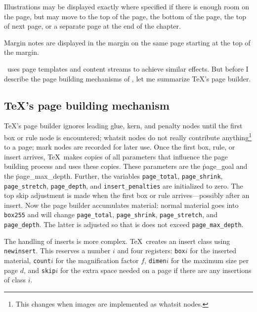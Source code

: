 \item Illustrations may be displayed exactly where specified if there is enough
room on the page, but may move to the top of the page, the bottom of the page,
the top of next page, or a separate page at the end of the chapter.

\item Margin notes are displayed in the margin on the same page starting at the top
of the margin.
\enditemize

\HINT\ uses page templates and content streams to achieve similar effects.
But before I describe the page building mechanisms of \HINT,
let me summarize \TeX's page builder.

\subsection{\TeX's page building mechanism}
\TeX's page builder ignores leading glue, kern,
and penalty nodes until the first
box or rule node is encountered;
whatsit nodes do not really contribute 
anything\footnote*{This changes when images are implemented as whatsit nodes.} to
a page; mark nodes are recorded for later use.  Once
the first box, rule, or insert arrives, \TeX\ makes
copies of all parameters that influence the page building process and
uses these copies. These parameters are the \.{page\_goal} and the
\.{page\_max\_depth}. Further, the variables {\tt page\_total}, {\tt page\_shrink},
{\tt page\_stretch}, {\tt page\_depth}, and {\tt in\-sert\_pe\-nal\-ties} are
initialized to zero.  The top skip adjustment is made
when the first box or rule arrives---possibly after an insert.
Now the page builder accumulates material: normal material goes
into {\tt box255} and will change {\tt page\_total}, {\tt page\_shrink}, 
{\tt page\_stretch}, and {\tt page\_depth}. The latter is adjusted so that 
is does not exceed {\tt page\_max\_depth}.

The handling of inserts is more complex.
\TeX\ creates an insert class using {\tt newinsert}. This reserves a number $i$
and four registers: {\tt box\hair$i$} for the inserted material,
{\tt count\hair$i$} for the magnification factor $f$, {\tt dimen\hair$i$}
for the maximum size per page $d$, and {\tt skip\hair$i$} for the
extra space needed on a page if there are any insertions of class $i$.

